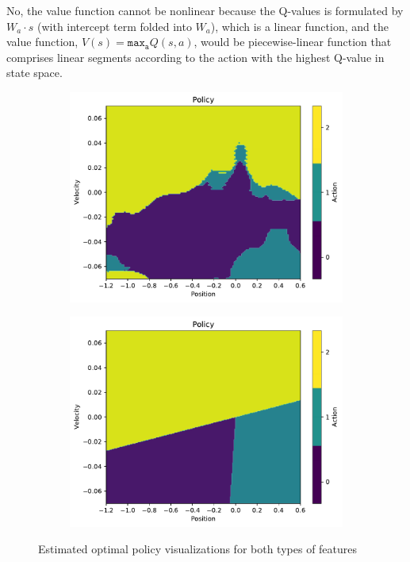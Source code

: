 \documentclass[11pt,addpoints,answers]{exam}
\begin{document}
\begin{questions}
\begin{parts}
    \begin{your_solution}[title=Answer,height=5cm]
        No, the value function cannot be nonlinear because the Q-values is formulated by $W_a\cdot s$ (with intercept term folded into $W_a$), which is a linear function, and the value function, $V(s) = \mathtt{max_a}Q(s, a)$, would be piecewise-linear function that comprises linear segments according to the action with the highest Q-value in state space.
    \end{your_solution}
 \begin{figure}[H]
        \centering
        \begin{subfigure}{0.5\textwidth}
            \includegraphics[width=\linewidth]{figs/policy_A.pdf}
            \caption{}
            \label{fig:policy_a}
        \end{subfigure}%
        \begin{subfigure}{0.5\textwidth}
            \includegraphics[width=\linewidth]{figs/policy_B.pdf}
            \caption{}
            \label{fig:policy_b}
        \end{subfigure}
        \caption{Estimated optimal policy visualizations for both types of features}
        \label{fig:policy}
    \end{figure}


\end{parts}
\end{questions}
\end{document}
